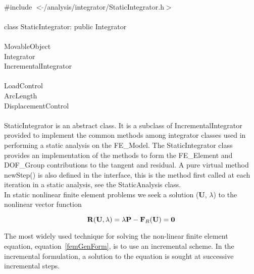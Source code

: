 
   \\
\indent \#include $<\tilde{ }$/analysis/integrator/StaticIntegrator.h$>$  \\

  \\
\indent class StaticIntegrator: public Integrator  \\

 \\
\indent MovableObject \\
\indent\indent Integrator \\
\indent\indent\indent IncrementalIntegrator \\
\indent\indent\indent{} \\
\indent\indent\indent\indent\indent LoadControl \\
\indent\indent\indent\indent\indent ArcLength \\
\indent\indent\indent\indent\indent DisplacementControl \\

 \\ 
\indent StaticIntegrator is an abstract class. It is a subclass of
IncrementalIntegrator provided to implement the common methods among
integrator classes used in performing a static analysis on the
FE\_Model. The StaticIntegrator class provides an implementation of
the methods to form the FE\_Element and DOF\_Group contributions to
the tangent and residual. A pure virtual method newStep() is
also defined in the interface, this is the method first called at each
iteration in a static analysis, see the StaticAnalysis class. \\

In static nonlinear finite element problems we seek a solution
($\mathbf{U}$, $\lambda$) to the nonlinear vector function

\begin{equation}
{\bf R}({\bf U}, \lambda) = \lambda {\bf P} - {\bf F}_R({\bf U}) = {\bf 0}
\label{staticGenForm}
\end{equation}

The most widely used technique for solving the non-linear finite
element equation, equation~\ref{femGenForm}, is to use an incremental
scheme. In the incremental formulation, a solution to the equation is
sought at successive incremental steps.  


